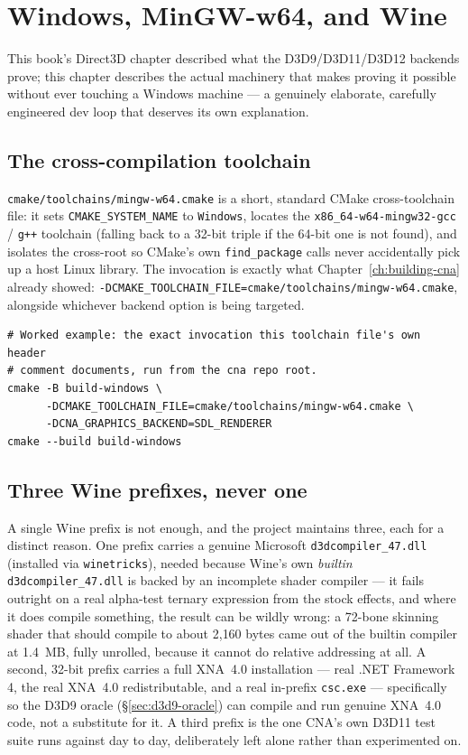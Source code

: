 \chapter{Windows, MinGW-w64, and Wine}
\label{ch:windows-wine}

This book's Direct3D chapter described what the D3D9/D3D11/D3D12 backends prove; this chapter
describes the actual machinery that makes proving it possible without ever touching a
Windows machine --- a genuinely elaborate, carefully engineered dev loop that deserves its
own explanation.

\section{The cross-compilation toolchain}

\texttt{cmake/toolchains/mingw-w64.cmake} is a short, standard CMake cross-toolchain file:
it sets \texttt{CMAKE\_SYSTEM\_NAME} to \texttt{Windows}, locates the
\texttt{x86\_64-w64-mingw32-gcc} / \texttt{g++} toolchain (falling back to a 32-bit triple if
the 64-bit one is not found), and isolates the cross-root so CMake's own
\texttt{find\_package} calls never accidentally pick up a host Linux library. The invocation
is exactly what Chapter~\ref{ch:building-cna} already showed:
\texttt{-DCMAKE\_TOOLCHAIN\_FILE=cmake/toolchains/mingw-w64.cmake}, alongside whichever
backend option is being targeted.

\begin{lstlisting}[style=cnashell]
# Worked example: the exact invocation this toolchain file's own header
# comment documents, run from the cna repo root.
cmake -B build-windows \
      -DCMAKE_TOOLCHAIN_FILE=cmake/toolchains/mingw-w64.cmake \
      -DCNA_GRAPHICS_BACKEND=SDL_RENDERER
cmake --build build-windows
\end{lstlisting}

\section{Three Wine prefixes, never one}

A single Wine prefix is not enough, and the project maintains three, each for a distinct
reason. One prefix carries a genuine Microsoft \texttt{d3dcompiler\_47.dll} (installed via
\texttt{winetricks}), needed because Wine's own \emph{builtin} \texttt{d3dcompiler\_47.dll} is
backed by an incomplete shader compiler --- it fails outright on a real alpha-test ternary
expression from the stock effects, and where it does compile something, the result can be
wildly wrong: a 72-bone skinning shader that should compile to about 2{,}160 bytes came out
of the builtin compiler at 1.4~MB, fully unrolled, because it cannot do relative addressing
at all. A second, 32-bit prefix carries a full XNA~4.0 installation --- real .NET Framework 4,
the real XNA~4.0 redistributable, and a real in-prefix \texttt{csc.exe} --- specifically so
the D3D9 oracle (\S\ref{sec:d3d9-oracle}) can compile and run genuine XNA~4.0 code, not a
substitute for it. A third prefix is the one CNA's own D3D11 test suite runs against day to
day, deliberately left alone rather than experimented on.

